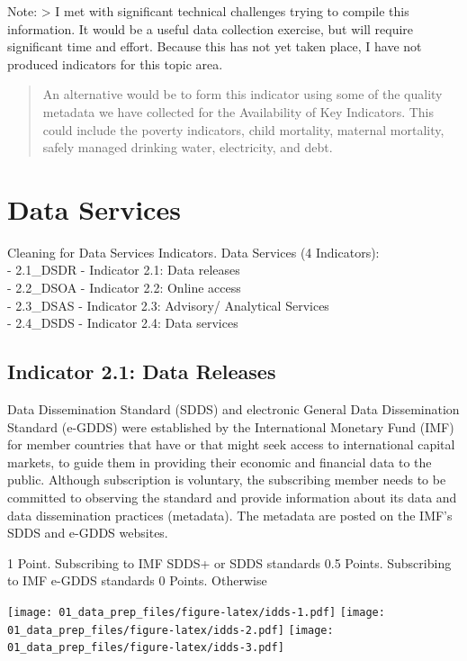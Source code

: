 \documentclass[]{article}
\begin{document}
Note: \textgreater{} I met with significant technical challenges trying
to compile this information. It would be a useful data collection
exercise, but will require significant time and effort. Because this has
not yet taken place, I have not produced indicators for this topic area.

\begin{quote}
An alternative would be to form this indicator using some of the quality
metadata we have collected for the Availability of Key Indicators. This
could include the poverty indicators, child mortality, maternal
mortality, safely managed drinking water, electricity, and debt.
\end{quote}

\hypertarget{data-services}{%
\section{Data Services}\label{data-services}}

Cleaning for Data Services Indicators. Data Services (4 Indicators):\\
- 2.1\_DSDR - Indicator 2.1: Data releases\\
- 2.2\_DSOA - Indicator 2.2: Online access\\
- 2.3\_DSAS - Indicator 2.3: Advisory/ Analytical Services\\
- 2.4\_DSDS - Indicator 2.4: Data services

\hypertarget{indicator-2.1-data-releases}{%
\subsection{Indicator 2.1: Data
Releases}\label{indicator-2.1-data-releases}}

Data Dissemination Standard (SDDS) and electronic General Data
Dissemination Standard (e-GDDS) were established by the International
Monetary Fund (IMF) for member countries that have or that might seek
access to international capital markets, to guide them in providing
their economic and financial data to the public. Although subscription
is voluntary, the subscribing member needs to be committed to observing
the standard and provide information about its data and data
dissemination practices (metadata). The metadata are posted on the IMF's
SDDS and e-GDDS websites.

1 Point. Subscribing to IMF SDDS+ or SDDS standards 0.5 Points.
Subscribing to IMF e-GDDS standards 0 Points. Otherwise

\texttt{[image: 01\_data\_prep\_files/figure-latex/idds-1.pdf]}
\texttt{[image: 01\_data\_prep\_files/figure-latex/idds-2.pdf]}
\texttt{[image: 01\_data\_prep\_files/figure-latex/idds-3.pdf]}
\end{document}
